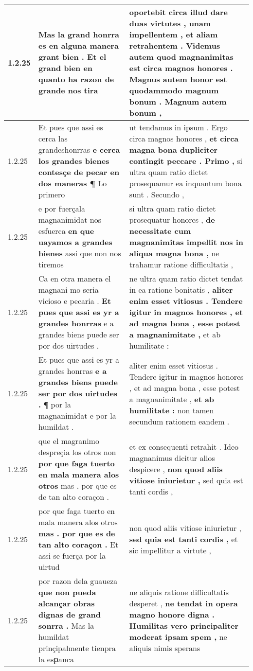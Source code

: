 \begin{tabular}{|p{1cm}|p{6.5cm}|p{6.5cm}|}
1.2.25 & Mas la grand honrra es en alguna manera grant bien . \textbf{ Et el grand bien } en quanto ha razon de grande nos tira & oportebit circa illud dare duas virtutes , \textbf{ unam impellentem , } et aliam retrahentem . Videmus autem quod magnanimitas est circa magnos honores . Magnus autem honor est quodammodo magnum bonum . Magnum autem bonum , \\\hline
1.2.25 & Et pues que assi es cerca las grandeshonrras \textbf{ e cerca los grandes bienes contesçe de pecar en dos maneras ¶ } Lo primero & ut tendamus in ipsum . Ergo circa magnos honores , \textbf{ et circa magna bona dupliciter contingit peccare . Primo , } si ultra quam ratio dictet prosequamur ea inquantum bona sunt . Secundo , \\\hline
1.2.25 & e por fuerçala magnanimidat nos esfuerca \textbf{ en que uayamos a grandes bienes } assi que non nos tiremos & si ultra quam ratio dictet prosequatur honores , \textbf{ de necessitate cum magnanimitas impellit nos in aliqua magna bona , } ne trahamur ratione difficultatis , \\\hline
1.2.25 & Ca en otra manera el magnani mo seria vicioso e pecaria . \textbf{ Et pues que assi es yr a grandes honrras } e a grandes biens puede ser por dos uirtudes . & ne ultra quam ratio dictet tendat in ea ratione bonitatis , \textbf{ aliter enim esset vitiosus . Tendere igitur in magnos honores , et ad magna bona , esse potest a magnanimitate , } et ab humilitate : \\\hline
1.2.25 & Et pues que assi es yr a grandes honrras \textbf{ e a grandes biens puede ser por dos uirtudes . } ¶ por la magnanimidat e por la humildat . & aliter enim esset vitiosus . Tendere igitur in magnos honores , et ad magna bona , esse potest a magnanimitate , \textbf{ et ab humilitate : } non tamen secundum rationem eandem . \\\hline
1.2.25 & que el magranimo despreçia los otros non \textbf{ por que faga tuerto en mala manera alos otros } mas . por que es de tan alto coraçon . & et ex consequenti retrahit . Ideo magnanimus dicitur alios despicere , \textbf{ non quod aliis vitiose iniurietur , } sed quia est tanti cordis , \\\hline
1.2.25 & por que faga tuerto en mala manera alos otros \textbf{ mas . por que es de tan alto coraçon . } Et assi se fuerça por la uirtud & non quod aliis vitiose iniurietur , \textbf{ sed quia est tanti cordis , } et sic impellitur a virtute , \\\hline
1.2.25 & por razon dela guaueza \textbf{ que non pueda alcançar obras dignas de grand sonrra . } Mas la humildat prinçipalmente tienpra la esꝑanca & ne aliquis ratione difficultatis desperet , \textbf{ ne tendat in opera magno honore digna . Humilitas vero principaliter moderat ipsam spem , } ne aliquis nimis sperans \\\hline

\end{tabular}
